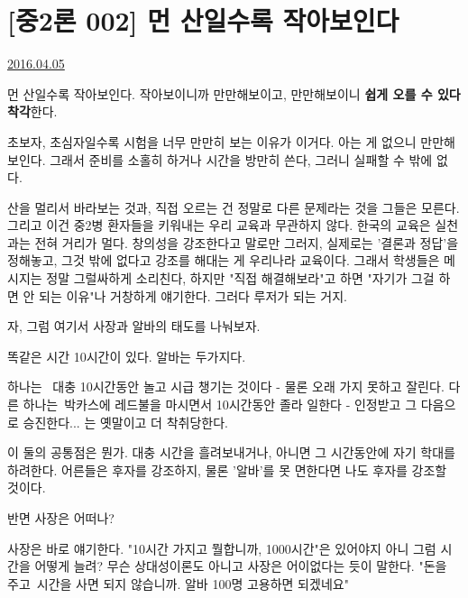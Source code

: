 \section{[중2론 002] 먼 산일수록 작아보인다}
\href{https://www.kockoc.com/Apoc/712608}{2016.04.05}

\vspace{5mm}

먼 산일수록 작아보인다.
작아보이니까 만만해보이고, 만만해보이니 \textbf{쉽게 오를 수 있다 착각}한다.
\vspace{5mm}

초보자, 초심자일수록 시험을 너무 만만히 보는 이유가 이거다.
아는 게 없으니 만만해보인다. 그래서 준비를 소홀히 하거나 시간을 방만히 쓴다, 그러니 실패할 수 밖에 없다.
\vspace{5mm}

산을 멀리서 바라보는 것과, 직접 오르는 건 정말로 다른 문제라는 것을 그들은 모른다.
그리고 이건 중2병 환자들을 키워내는 우리 교육과 무관하지 않다.
한국의 교육은 실천과는 전혀 거리가 멀다.
창의성을 강조한다고 말로만 그러지, 실제로는 '결론과 정답'을 정해놓고,
그것 밖에 없다고 강조를 해대는 게 우리나라 교육이다.
그래서 학생들은 메시지는 정말 그럴싸하게 소리친다, 하지만 "직접 해결해보라"고 하면
"자기가 그걸 하면 안 되는 이유"나 거창하게 얘기한다.
그러다 루저가 되는 거지.
\vspace{5mm}

자, 그럼 여기서 사장과 알바의 태도를 나눠보자.
\vspace{5mm}

똑같은 시간 10시간이 있다.
알바는 두가지다.
\vspace{5mm}

하나는  대충 10시간동안 놀고 시급 챙기는 것이다 - 물론 오래 가지 못하고 잘린다.
다른 하나는 박카스에 레드불을 마시면서 10시간동안 졸라 일한다 - 인정받고 그 다음으로 승진한다... 는 옛말이고 더 착취당한다.
\vspace{5mm}

이 둘의 공통점은 뭔가. 대충 시간을 흘려보내거나, 아니면 그 시간동안에 자기 학대를 하려한다.
어른들은 후자를 강조하지, 물론 '알바'를 못 면한다면 나도 후자를 강조할 것이다.
\vspace{5mm}

반면 사장은 어떠나?
\vspace{5mm}

사장은 바로 얘기한다. "10시간 가지고 뭘합니까, 1000시간"은 있어야지
아니 그럼 시간을 어떻게 늘려? 무슨 상대성이론도 아니고
사장은 어이없다는 듯이 말한다. "돈을 주고 시간을 사면 되지 않습니까. 알바 100명 고용하면 되겠네요"
\vspace{5mm}

